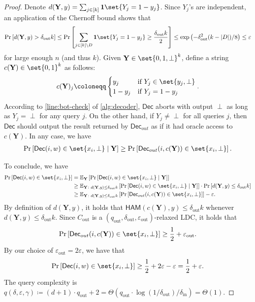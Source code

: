 \documentclass[10pt,a4paper]{article}
\theoremstyle{remark}
\newcommand{\tuple}[1]{\ensuremath{\left(#1\right)}}
\newcommand{\tp}{\tuple}
\newcommand{\eps}{\ensuremath{\varepsilon}}
\newcommand{\Dec}{\ensuremath{\mathsf{Dec}}\xspace}
\newcommand{\HAM}{\ensuremath{\mathsf{HAM}}}
\newcommand{\Cout}{C_{\text{out}}}
\newcommand{\dout}{\delta_{\text{out}}}
\newcommand{\qout}{q_{\text{out}}}
\newcommand{\epsout}{\eps_{\text{out}}}
\newcommand{\din}{\delta_{\text{in}}}
\newcommand{\ham}{\HAM\xspace}
\providecommand{\E}{\ensuremath{\mathbb{E}}\xspace}
\begin{document}
\begin{proof}
	Denote $d(\mathbf{Y}, y)=\sum_{j \in [k]}\mathbf{1}\set{Y_j=1-y_j}$. 
	Since $Y_j$'s are independent, an application of the Chernoff bound shows that
	\begin{align*}
		\Pr\left[ d(\mathbf{Y},y) > \dout k \right] \le \Pr\left[ \sum_{j \in [k]\setminus D}\mathbf{1}\set{Y_j=1-y_j}\ge \frac{\dout k}{2} \right] \le \exp\tp{-\dout^2(k-|D|)/8} \le \eps
	\end{align*}
	for large enough $n$ (and thus $k$).
	Given $\mathbf{Y} \in \set{0,1,\perp}^k$, define a string $c(\mathbf{Y}) \in \set{0,1}^k$ as follows: 
	\begin{align*}
		c(\mathbf{Y})_j \coloneqq \begin{cases}
			y_j & \textup{if $Y_j \in \set{y_j, \perp}$} \\
			1-y_j & \textup{if $Y_j = 1-y_j$}
		\end{cases}.
	\end{align*}
	According to \cref{line:bot-check} of \cref{alg:decoder}, $\Dec$ aborts with output $\perp$ as long as $Y_j=\perp$ for any query $j$. 
	On the other hand, if $Y_j \neq \perp$ for all queries $j$, then $\Dec$ should output the result returned by $\Dec_{out}$ as if it had oracle access to $c(\mathbf{Y})$. 
	In any case, we have
	\begin{align*}
		\Pr\left[ \Dec(i, w) \in \set{x_i, \perp} \mid \mathbf{Y} \right] \ge \Pr\left[  \Dec_{out}(i, c(\mathbf{Y})) \in \set{x_i, \perp} \right].
	\end{align*}
	
	To conclude, we have
	\begin{align*}
		\Pr\left[ \Dec(i, w) \in \set{x_i, \perp} \right] &= \E_{\mathbf{Y}}\left[ \Pr\left[ \Dec(i, w) \in \set{x_i, \perp} \mid \mathbf{Y} \right] \right] \\
		&\ge \E_{\mathbf{Y}\colon d(\mathbf{Y}, y)\le \dout k}\left[ \Pr\left[ \Dec(i, w) \in \set{x_i, \perp} \mid \mathbf{Y} \right] \right] \cdot \Pr\left[ d(\mathbf{Y}, y) \le \dout k \right] \\
		&\ge \E_{\mathbf{Y}\colon d(\mathbf{Y}, y)\le \dout k}\left[ \Pr\left[  \Dec_{out}(i, c(\mathbf{Y})) \in \set{x_i, \perp} \right] \right] - \eps.
	\end{align*}
	By definition of $d(\mathbf{Y}, y)$, it holds that $\ham(c(\mathbf{Y}), y)\le \dout k$ whenever $d(\mathbf{Y}, y) \leq \dout k$. 
	Since $\Cout$ is a $(\qout, \dout, \epsout)$-relaxed LDC, it holds that 
	\begin{align*}
		\Pr\left[  \Dec_{out}(i, c(\mathbf{Y})) \in \set{x_i, \perp} \right] \ge \frac{1}{2} + \epsout.
	\end{align*}
	By our choice of $\epsout = 2\eps$, we have that
	\begin{align*}
		\Pr\left[ \Dec(i, w) \in \set{x_i, \perp} \right] \ge \frac{1}{2} + 2\eps - \eps = \frac{1}{2} + \eps.
	\end{align*}
	The query complexity is $q(\delta, \eps, \gamma) \coloneqq (d+1)\cdot\qout + 2 = \Theta\tp{\qout \cdot \log(1/\dout)/\din} = \Theta(1)$.
\end{proof}
\end{document}
